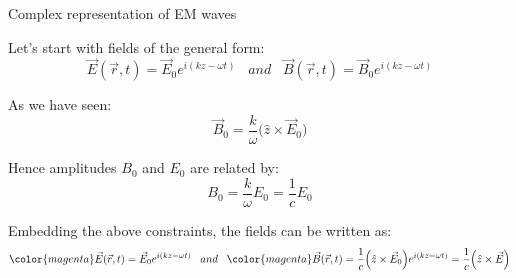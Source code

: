 \begin{frame}{Complex representation of EM waves}

Let's start with fields of the general form:
\begin{equation*}
    \vec{E}(\vec{r},t) = \vec{E}_0  e^{i (kz-\omega t)}
    \;\;\; and \;\;\;
    \vec{B}(\vec{r},t) = \vec{B}_0  e^{i (kz-\omega t)}
\end{equation*}

As we have seen:
\begin{equation*}
       \vec{B}_{0} = \frac{k}{\omega} \Big( \hat{z} \times \vec{E}_0 \Big)
\end{equation*}

Hence amplitudes $B_{0}$ and $E_{0}$ are related by:
\begin{equation*}
     B_{0} = \frac{k}{\omega} E_0 = \frac{1}{c} E_0
\end{equation*}

Embedding the above constraints, the fields can be written as:
\begin{equation*}
    {\color{magenta} \vec{E}(\vec{r},t) = \vec{E}_0  e^{i (kz-\omega t)}  }
    \;\;\; and \;\;\;
    {\color{magenta} \vec{B}(\vec{r},t) = \frac{1}{c} \Big( \hat{z}
      \times \vec{E}_0 \Big)  e^{i (kz-\omega t)} = \frac{1}{c} \Big(
      \hat{z} \times \vec{E} \Big) }
\end{equation*}


\end{frame}


%
%
%

